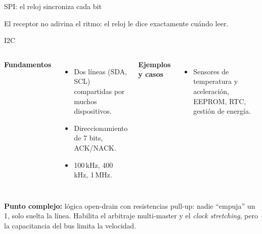 \documentclass[aspectratio=169,11pt]{beamer}
\newcommand{\complejo}[1]{{\color{cobre}\textbf{Punto complejo:}} #1}
\begin{document}
\begin{frame}{SPI: el reloj sincroniza cada bit}
\begin{center}
\end{center}
\vspace{0.3em}
{\footnotesize El receptor no adivina el ritmo: el reloj le dice exactamente cuándo leer.}
\end{frame}

\begin{frame}{I2C}
\begin{columns}[T]
\textbf{Fundamentos}
\begin{itemize}\small
  \item Dos líneas (SDA, SCL) compartidas por muchos dispositivos.
  \item Direccionamiento de 7 bits, ACK/NACK.
  \item 100\,kHz, 400\,kHz, 1\,MHz.
\end{itemize}
\textbf{Ejemplos y casos}
\begin{itemize}\small
  \item Sensores de temperatura y aceleración, EEPROM, RTC, gestión de energía.
\end{itemize}
\end{columns}
\vspace{0.4em}
\complejo{lógica \alert{open-drain con resistencias pull-up}: nadie ``empuja'' un 1, solo suelta la línea. Habilita el arbitraje multi-master y el \emph{clock stretching}, pero la capacitancia del bus limita la velocidad.}
\end{frame}
\end{document}
